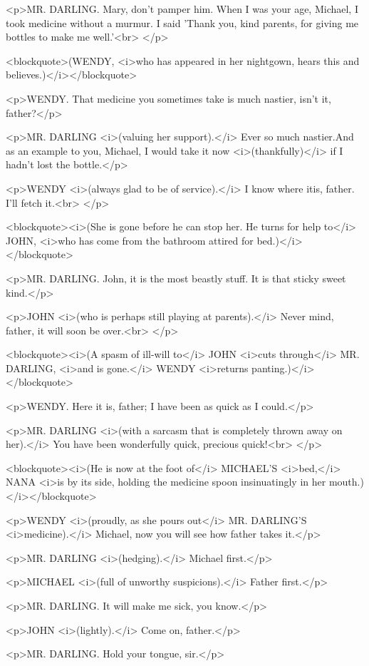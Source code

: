 <p>MR. DARLING. Mary, don't pamper him. When I was your age, Michael,
I took medicine without a murmur. I said 'Thank you, kind parents,
for giving me bottles to make me well.'<br>
</p>

<blockquote>(WENDY, <i>who has appeared in her nightgown, hears this
and believes.)</i></blockquote>

<p>WENDY. That medicine you sometimes take is much nastier, isn't it,
father?</p>

<p>MR. DARLING <i>(valuing her support).</i> Ever so much nastier.And
as an example to you, Michael, I would take it now
<i>(thankfully)</i> if I hadn't lost the bottle.</p>

<p>WENDY <i>(always glad to be of service).</i> I know where itis,
father. I'll fetch it.<br>
</p>

<blockquote><i>(She is gone before he can stop her. He turns for help
to</i> JOHN, <i>who has come from the bathroom attired for
bed.)</i></blockquote>

<p>MR. DARLING. John, it is the most beastly stuff. It is that sticky
sweet kind.</p>

<p>JOHN <i>(who is perhaps still playing at parents).</i> Never mind,
father, it will soon be over.<br>
</p>

<blockquote><i>(A spasm of ill-will to</i> JOHN <i>cuts through</i>
MR. DARLING, <i>and is gone.</i> WENDY <i>returns
panting.)</i></blockquote>

<p>WENDY. Here it is, father; I have been as quick as I could.</p>

<p>MR. DARLING <i>(with a sarcasm that is completely thrown away on
her).</i> You have been wonderfully quick, precious quick!<br>
</p>

<blockquote><i>(He is now at the foot of</i> MICHAEL'S <i>bed,</i>
NANA <i>is by its side, holding the medicine spoon insinuatingly in
her mouth.)</i></blockquote>

<p>WENDY <i>(proudly, as she pours out</i> MR. DARLING'S
<i>medicine).</i> Michael, now you will see how father takes it.</p>

<p>MR. DARLING <i>(hedging).</i> Michael first.</p>

<p>MICHAEL <i>(full of unworthy suspicions).</i> Father first.</p>

<p>MR. DARLING. It will make me sick, you know.</p>

<p>JOHN <i>(lightly).</i> Come on, father.</p>

<p>MR. DARLING. Hold your tongue, sir.</p>

